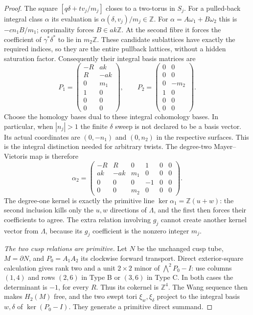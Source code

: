 \begin{proof}
The square $[q\delta+t v_j/m_j]$ closes to a two-torus in $S_j$.
For a pulled-back integral class $\alpha$ its evaluation is
$\alpha(\delta,v_j)/m_j\in\mathbb Z$.
For $\alpha=A\omega_1+B\omega_2$ this is
$-cn_1B/m_1$; coprimality forces $B\in ak\mathbb Z$.
At the second fibre it forces the coefficient of
$\gamma^*\delta^*$ to lie in $m_2\mathbb Z$.
These candidate sublattices have exactly the required indices,
so they are the entire pullback lattices, without a hidden
saturation factor. Consequently their integral basis matrices are
\[
 P_1=\begin{pmatrix}
 -R&ak\\R&-ak\\0&m_1\\1&0\\0&0\\0&0
 \end{pmatrix},\qquad
 P_2=\begin{pmatrix}
 0&0\\0&0\\0&-m_2\\1&0\\0&0\\0&0
 \end{pmatrix}.
\]
Choose the homology bases dual to these integral cohomology
bases. In particular, when $|n_j|>1$ the finite $\delta$ sweep is
not declared to be a basis vector. Its actual coordinates are
$(0,-n_1)$ and $(0,n_2)$ in the respective surfaces. This is the
integral distinction needed for arbitrary twists.
The degree-two Mayer--Vietoris map is therefore
\[
 \alpha_2=\begin{pmatrix}
 -R&R&0&1&0&0\\ak&-ak&m_1&0&0&0\\
 0&0&0&-1&0&0\\0&0&m_2&0&0&0
 \end{pmatrix}.
\]
The degree-one kernel is exactly the primitive line
$\ker\alpha_1=\mathbb Z(u+w)$: the second inclusion kills only
the $u,w$ directions of $\Lambda$, and the first then forces their
coefficients to agree. The extra relation involving $g_j$ cannot
create another kernel vector from $\Lambda$, because its
$g_j$ coefficient is the nonzero integer $m_j$.

\emph{The two cusp relations are primitive.}
Let $N$ be the unchanged cusp tube, $M=\partial N$, and
$P_0=A_1A_2$ its clockwise forward transport.
Direct exterior-square calculation gives rank two and a unit
$2\times2$ minor of $\bigwedge^2P_0-I$: use columns $(1,4)$
and rows $(2,6)$ in Type B or $(3,6)$ in Type C.
In both cases the determinant is $-1$, for every $R$.
Thus its cokernel is $\mathbb Z^4$. The Wang sequence then makes
$H_2(M)$ free, and the two swept tori $\xi_w,\xi_\delta$ project
to the integral basis $w,\delta$ of $\ker(P_0-I)$.
They generate a primitive direct summand.


\end{proof}
